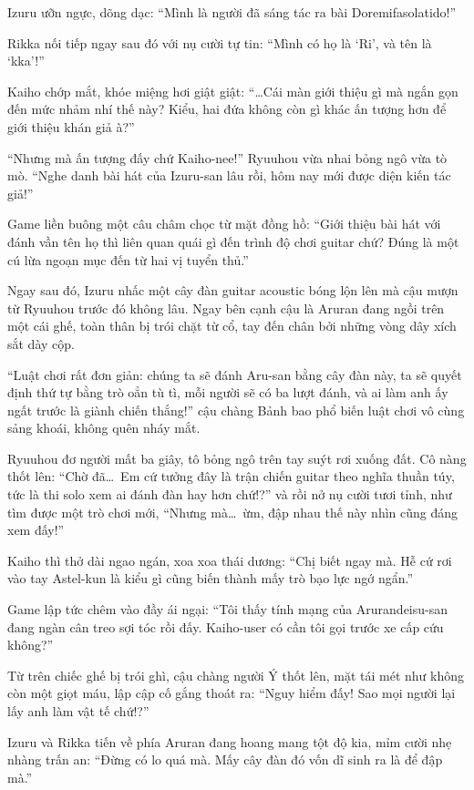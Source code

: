 \documentclass[../main.tex]{subfiles}
\begin{document}
Izuru ưỡn ngực, dõng dạc: ``Mình là người đã sáng tác ra bài Doremifasolatido!''

Rikka nối tiếp ngay sau đó với nụ cười tự tin: ``Mình có họ là `Ri', và tên là `kka'!''

Kaiho chớp mắt, khóe miệng hơi giật giật: ``\dots Cái màn giới thiệu gì mà ngắn gọn đến mức nhảm nhí thế này? Kiểu, hai đứa không còn gì khác ấn tượng hơn để giới thiệu khán giả à?''

``Nhưng mà ấn tượng đấy chứ Kaiho-nee!'' Ryuuhou vừa nhai bỏng ngô vừa tò mò. ``Nghe danh bài hát của Izuru-san lâu rồi, hôm nay mới được diện kiến tác giả!''

Game liền buông một câu châm chọc từ mặt đồng hồ: ``Giới thiệu bài hát với đánh vần tên họ thì liên quan quái gì đến trình độ chơi guitar chứ? Đúng là một cú lừa ngoạn mục đến từ hai vị tuyển thủ.''

Ngay sau đó, Izuru nhấc một cây đàn guitar acoustic bóng lộn lên mà cậu mượn từ Ryuuhou trước đó không lâu. Ngay bên cạnh cậu là Aruran đang ngồi trên một cái ghế, toàn thân bị trói chặt từ cổ, tay đến chân bởi những vòng dây xích sắt dày cộp.

``Luật chơi rất đơn giản: chúng ta sẽ đánh Aru-san bằng cây đàn này, ta sẽ quyết định thứ tự bằng trò oẳn tù tì, mỗi người sẽ có ba lượt đánh, và ai làm anh ấy ngất trước là giành chiến thắng!'' cậu chàng Bảnh bao phổ biến luật chơi vô cùng sảng khoái, không quên nháy mắt.


Ryuuhou đơ người mất ba giây, tô bỏng ngô trên tay suýt rơi xuống đất. Cô nàng thốt lên: ``Chờ đã\dots\ Em cứ tưởng đây là trận chiến guitar theo nghĩa thuần túy, tức là thi solo xem ai đánh đàn hay hơn chứ!?'' và rồi nở nụ cười tươi tỉnh, như tìm được một trò chơi mới, ``Nhưng mà\dots\ ừm, đập nhau thế này nhìn cũng đáng xem đấy!''

Kaiho thì thở dài ngao ngán, xoa xoa thái dương: ``Chị biết ngay mà. Hễ cứ rơi vào tay Astel-kun là kiểu gì cũng biến thành mấy trò bạo lực ngớ ngẩn.''

Game lập tức chêm vào đầy ái ngại: ``Tôi thấy tính mạng của Arurandeisu-san đang ngàn cân treo sợi tóc rồi đấy. Kaiho-user có cần tôi gọi trước xe cấp cứu không?''

Từ trên chiếc ghế bị trói ghì, cậu chàng người Ý thốt lên, mặt tái mét như không còn một giọt máu, lập cập cố gắng thoát ra: ``Nguy hiểm đấy! Sao mọi người lại lấy anh làm vật tế chứ!?''

Izuru và Rikka tiến về phía Aruran đang hoang mang tột độ kia, mỉm cười nhẹ nhàng trấn an: ``Đừng có lo quá mà. Mấy cây đàn đó vốn dĩ sinh ra là để đập mà.''
\end{document}
